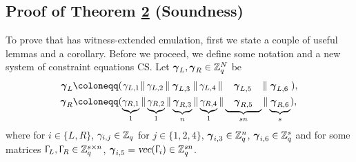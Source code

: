   
  \subsection{Proof of Theorem \hyperref[label:thm2]{2} (Soundness)}
  \label{scnProofTheorem2}
  \vspace{-3pt}
  To prove that \proto has witness-extended emulation, first we state a couple of useful lemmas and a corollary.
  Before we proceed, we define some notation and a new system of constraint equations \textsf{CS}. Let ${\boldsymbol{\gamma}}_L, {\boldsymbol{\gamma}}_R \in \mathbb{Z}_q^N$ be
  \begin{align*}
      \vecnb{\gamma}_{L} 
      &\coloneqq 
      (\hspace{0.25mm} \gamma_{L,1} \hspace{0.25mm} \|
      \hspace{0.58mm} \gamma_{L,2} \hspace{0.55mm}\|
      \hspace{0.9mm} \vecnb{\gamma}_{L,3} \hspace{0.9mm}\|
      \hspace{0.6mm} \gamma_{L,4} \hspace{0.6mm}\|
      \hspace{4mm}
      \vecnb{\gamma}_{L,5}
      \hspace{4mm} \|
      \hspace{1mm} \vecnb{\gamma}_{L,6} \hspace{1mm}),\\
      \vecnb{\gamma}_{R} &\coloneqq 
      (\underbrace{\hspace{-0.2mm} \gamma_{R,1} \hspace{-0.2mm}}_{1} \|
      \underbrace{\hspace{-0.2mm} \gamma_{R,2} \hspace{-0.2mm}}_{1}\|
      \underbrace{\hspace{0.1mm} \vecnb{\gamma}_{R,3} \hspace{0.1mm}}_{n}\|
      \underbrace{\hspace{-0.2mm} \gamma_{R,4} \hspace{-0.2mm}}_{1}\|
      \underbrace{\hspace{3.2mm} \vecnb{\gamma}_{R,5} \hspace{3.2mm}}_{sn} \|
      \underbrace{\hspace{0.38mm} \vecnb{\gamma}_{R,6} \hspace{0.38mm}}_{s}),
  \end{align*}
  where for $i \in \{L,R\}$, $\gamma_{i,j} \in \mathbb{Z}_q$ for $j\in \{1,2,4\}$, ${\boldsymbol{\gamma}}_{i,3} \in \mathbb{Z}_q^n$, ${\boldsymbol{\gamma}}_{i,6} \in \mathbb{Z}_q^s$ and for some matrices $\Upgamma_L, \Upgamma_R \in \mathbb{Z}_q^{s \times n}$, ${\boldsymbol{\gamma}}_{i,5} = \textsl{vec}(\Upgamma_{i}) \in \mathbb{Z}_q^{sn}$.
